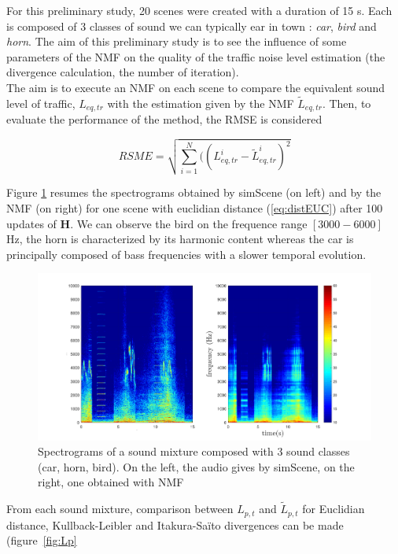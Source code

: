 \documentclass{article}
\begin{document}
\begin{sloppy}
For this preliminary study, 20 scenes were created with a duration of 15 s. Each is composed of 3 classes of sound we can typically ear in town : \textit{car}, \textit{bird} and \textit{horn}. The aim of this preliminary study is to see the influence of some parameters of the NMF on the quality of the traffic noise level estimation (the divergence calculation, the number of iteration).\\

The aim is to execute an NMF on each scene to compare 
the equivalent sound level of traffic, $L_{eq,tr}$ with the estimation given by the NMF $\tilde{L}_{eq,tr}$.
Then, to evaluate the performance of the method, the RMSE is considered

\begin{equation}
RSME = \sqrt{\sum_{i = 1}^N((L^i_{eq,tr}-\tilde{L}^i_{eq,tr})^2}
\end{equation}

Figure \ref{fig:spectrogram} resumes the spectrograms obtained by simScene (on left) and by the NMF (on right) for one scene with euclidian distance (\ref{eq:distEUC}) after 100 updates of $\mathbf{H}$. We can observe the bird on the frequence range $\left[3000-6000\right]$ Hz, the horn is characterized by its harmonic content whereas the car is principally composed of bass frequencies with a slower temporal evolution.

\begin{figure}[btp]
\centering
\includegraphics[scale=0.25]{./images/bvak_Sc2_V_spectre_Euc.pdf}
\caption{Spectrograms of a sound mixture composed with 3 sound classes (car, horn, bird). On the left, the audio gives by simScene, on the right, one obtained with NMF}
\label{fig:spectrogram}
\end{figure}

From each sound mixture, comparison between $L_{p,t}$ and $\tilde{L}_{p,t}$ for Euclidian distance, Kullback-Leibler and Itakura-Saïto divergences can be made (figure~\ref{fig:Lp}


\end{sloppy}
\end{document}
